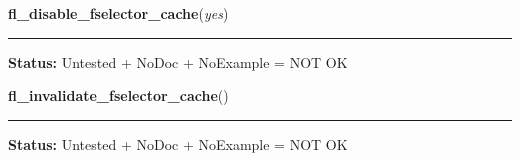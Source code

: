     \label{xformslib:library:fl_disable_fselector_cache}

    \vspace{0.5ex}

\hspace{.8\funcindent}\begin{boxedminipage}{\funcwidth}

    \raggedright \textbf{fl\_disable\_fselector\_cache}(\textit{yes})

    \vspace{-1.5ex}

    \rule{\textwidth}{0.5\fboxrule}
\setlength{\parskip}{2ex}
\setlength{\parskip}{1ex}
\textbf{Status:} Untested + NoDoc + NoExample = NOT OK



    \end{boxedminipage}

    \label{xformslib:library:fl_invalidate_fselector_cache}

    \vspace{0.5ex}

\hspace{.8\funcindent}\begin{boxedminipage}{\funcwidth}

    \raggedright \textbf{fl\_invalidate\_fselector\_cache}()

    \vspace{-1.5ex}

    \rule{\textwidth}{0.5\fboxrule}
\setlength{\parskip}{2ex}
\setlength{\parskip}{1ex}
\textbf{Status:} Untested + NoDoc + NoExample = NOT OK



    \end{boxedminipage}

    \label{xformslib:library:fl_get_fselector_form}

    \vspace{0.5ex}

